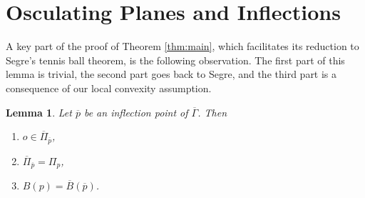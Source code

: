 \documentclass[11pt]{amsart}
\newtheorem{lem}[thm]{Lemma}
\theoremstyle{definition}
\newcommand{\ol}{\overline}
\renewcommand{\(}{\left(}
\renewcommand{\)}{\right)}
\begin{document}
\section{Osculating Planes and Inflections}
A key part of the proof of Theorem \ref{thm:main}, which facilitates its reduction to Segre's tennis ball theorem, is the following observation. The first part of this lemma is trivial, the second part goes back to Segre, and the third part is a consequence of our local convexity assumption. 
\begin{lem}\label{lem:osculate}
Let $\ol p$ be an inflection point of $\ol\Gamma$. Then 
\begin{enumerate}
\item[(i)] $o\in\ol\Pi_{\ol p}$, 
\item[(ii)] $\ol\Pi_{\ol p}=\Pi_p$, 
\item[(iii)] $B(p)= \ol B(\ol p)$.
\end{enumerate}
\end{lem}
\end{document}
